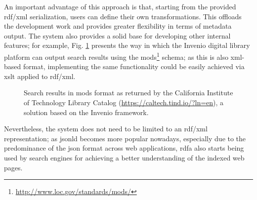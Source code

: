 An important advantage of this approach is that, starting from the provided \gls{rdf}/\gls{xml} serialization, users can define their own transformations. This offloads the development work and provides greater flexibility in terms of metadata output. The system also provides a solid
base for developing other internal features; for example, Fig. \ref{fig:tind_search} presents the way in which the Invenio digital library platform can output search results using the \gls{mods}\footnote{\url{http://www.loc.gov/standards/mods/}} schema; as this is also \gls{xml}-based format, implementing the same functionality could be easily achieved via \gls{xslt} applied to \gls{rdf}/\gls{xml}.

\begin{figure}[t]
  \centering
  \caption{Search results in \gls{mods} format as returned by the California Institute of Technology Library Catalog (\url{https://caltech.tind.io/?ln=en}), a solution based on the Invenio framework.}
  \label{fig:tind_search}
\end{figure}

Nevertheless, the system does not need to be limited to an \gls{rdf}/\gls{xml} representation; as \gls{jsonld} becomes more popular nowadays, especially due to the predominance of the \gls{json} format across web applications, \gls{rdfa} also starts being used by search engines for achieving a better understanding of the indexed web pages\cite{googleld}.


